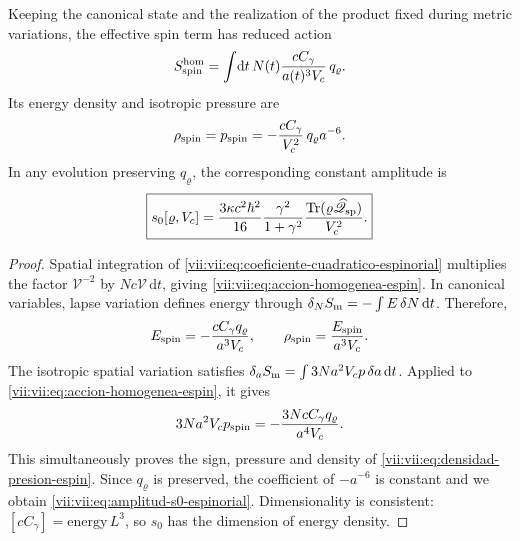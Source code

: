 \begin{theorem}
\label{vii:vii:thm:amplitud-material-explicita}
Keeping the canonical state and the realization of the product fixed
during metric variations, the effective spin term has
reduced action
\begin{equation}
 S_{\rm spin}^{\rm hom}
 =\int\!\mathrm dt\,N(t)
       \frac{cC_\gamma}{a(t)^3V_c}\,q_\varrho.
 \label{vii:vii:eq:accion-homogenea-espin}
\end{equation}
Its energy density and isotropic pressure are
\begin{equation}
 \rho_{\rm spin}=p_{\rm spin}
 =-\frac{cC_\gamma}{V_c^2}\,q_\varrho a^{-6}.
 \label{vii:vii:eq:densidad-presion-espin}
\end{equation}
In any evolution preserving \(q_\varrho\), the corresponding
constant amplitude is
\begin{equation}
 \boxed{\displaystyle
 s_0[\varrho,V_c]
 =\frac{3\kappa c^2\hbar^2}{16}
    \frac{\gamma^2}{1+\gamma^2}
    \frac{\operatorname{Tr}
       (\varrho\widehat{\mathscr Q}_{\rm sp})}{V_c^2}.}
 \label{vii:vii:eq:amplitud-s0-espinorial}
\end{equation}
\end{theorem}
\begin{proof}
Spatial integration of
\eqref{vii:vii:eq:coeficiente-cuadratico-espinorial} multiplies the
factor \(\mathcal V^{-2}\) by
\(Nc\mathcal V\,\mathrm dt\), giving
\eqref{vii:vii:eq:accion-homogenea-espin}. In canonical variables,
lapse variation defines energy through
\(\delta_N S_{\rm m}=-\int E\,\delta N\,\mathrm dt\).
Therefore,
\[
 E_{\rm spin}=-\frac{cC_\gamma q_\varrho}{a^3V_c},
 \qquad \rho_{\rm spin}=\frac{E_{\rm spin}}{a^3V_c}.
\]
The isotropic spatial variation satisfies
\(\delta_a S_{\rm m}=\int3Na^2V_c p\,\delta a\,\mathrm dt\).
Applied to \eqref{vii:vii:eq:accion-homogenea-espin}, it gives
\[
 3Na^2V_c p_{\rm spin}
 =-\frac{3NcC_\gamma q_\varrho}{a^4V_c}.
\]
This simultaneously proves the sign, pressure and density of
\eqref{vii:vii:eq:densidad-presion-espin}. Since
\(q_\varrho\) is preserved, the coefficient of \(-a^{-6}\) is constant and
we obtain \eqref{vii:vii:eq:amplitud-s0-espinorial}. Dimensionality
is consistent: \([cC_\gamma]=\text{energy}\,L^3\),
so \(s_0\) has the dimension of energy density.
\end{proof}

